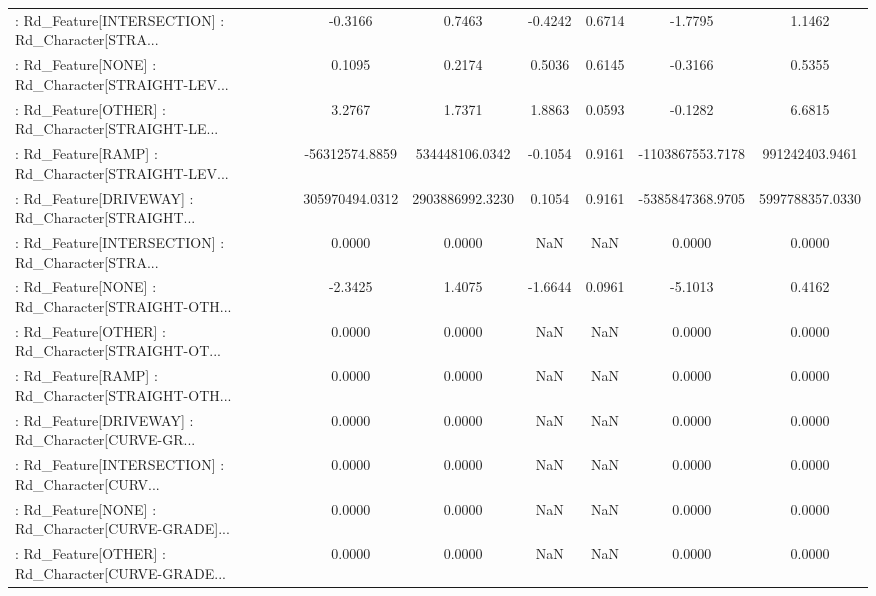 \begin{longtable}{p{4cm}cccccc}
 : Rd\_Feature[INTERSECTION] : Rd\_Character[STRA... &           -0.3166 &            0.7463 & -0.4242 &       0.6714 &            -1.7795 &            1.1462 \\
 : Rd\_Feature[NONE] : Rd\_Character[STRAIGHT-LEV... &            0.1095 &            0.2174 &  0.5036 &       0.6145 &            -0.3166 &            0.5355 \\
 : Rd\_Feature[OTHER] : Rd\_Character[STRAIGHT-LE... &            3.2767 &            1.7371 &  1.8863 &       0.0593 &            -0.1282 &            6.6815 \\
 : Rd\_Feature[RAMP] : Rd\_Character[STRAIGHT-LEV... &    -56312574.8859 &    534448106.0342 & -0.1054 &       0.9161 &   -1103867553.7178 &    991242403.9461 \\
 : Rd\_Feature[DRIVEWAY] : Rd\_Character[STRAIGHT... &    305970494.0312 &   2903886992.3230 &  0.1054 &       0.9161 &   -5385847368.9705 &   5997788357.0330 \\
 : Rd\_Feature[INTERSECTION] : Rd\_Character[STRA... &            0.0000 &            0.0000 &     NaN &          NaN &             0.0000 &            0.0000 \\
 : Rd\_Feature[NONE] : Rd\_Character[STRAIGHT-OTH... &           -2.3425 &            1.4075 & -1.6644 &       0.0961 &            -5.1013 &            0.4162 \\
 : Rd\_Feature[OTHER] : Rd\_Character[STRAIGHT-OT... &            0.0000 &            0.0000 &     NaN &          NaN &             0.0000 &            0.0000 \\
 : Rd\_Feature[RAMP] : Rd\_Character[STRAIGHT-OTH... &            0.0000 &            0.0000 &     NaN &          NaN &             0.0000 &            0.0000 \\
 : Rd\_Feature[DRIVEWAY] : Rd\_Character[CURVE-GR... &            0.0000 &            0.0000 &     NaN &          NaN &             0.0000 &            0.0000 \\
 : Rd\_Feature[INTERSECTION] : Rd\_Character[CURV... &            0.0000 &            0.0000 &     NaN &          NaN &             0.0000 &            0.0000 \\
 : Rd\_Feature[NONE] : Rd\_Character[CURVE-GRADE]... &            0.0000 &            0.0000 &     NaN &          NaN &             0.0000 &            0.0000 \\
 : Rd\_Feature[OTHER] : Rd\_Character[CURVE-GRADE... &            0.0000 &            0.0000 &     NaN &          NaN &             0.0000 &            0.0000 \\

\end{longtable}
